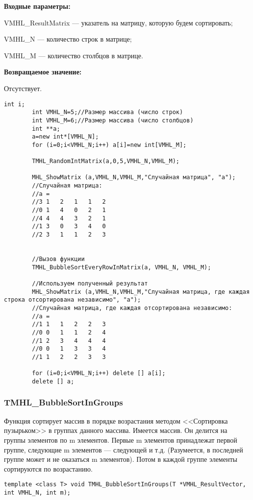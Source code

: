 \documentclass[a4paper,12pt]{article}
\begin{document}
\textbf{Входные параметры:}
 
VMHL\_ResultMatrix --- указатель на матрицу, которую будем сортировать;
 
VMHL\_N --- количество строк в матрице;
 
VMHL\_M --- количество столбцов в матрице.

\textbf{Возвращаемое значение:}

Отсутствует.


\begin{lstlisting}[label=code_use_TMHL_BubbleSortEveryRowInMatrix,caption=Пример использования]
        int i;
        int VMHL_N=5;//Размер массива (число строк)
        int VMHL_M=6;//Размер массива (число столбцов)
        int **a;
        a=new int*[VMHL_N];
        for (i=0;i<VMHL_N;i++) a[i]=new int[VMHL_M];

        TMHL_RandomIntMatrix(a,0,5,VMHL_N,VMHL_M);

        MHL_ShowMatrix (a,VMHL_N,VMHL_M,"Случайная матрица", "a");
        //Случайная матрица:
        //a =
        //3	1	2	1	1	2
        //0	1	4	0	2	1
        //4	4	4	3	2	1
        //1	3	0	3	4	0
        //2	3	1	1	2	3


        //Вызов функции
        TMHL_BubbleSortEveryRowInMatrix(a, VMHL_N, VMHL_M);

        //Используем полученный результат
		MHL_ShowMatrix (a,VMHL_N,VMHL_M,"Случайная матрица, где каждая строка отсортирована независимо", "a");
        //Случайная матрица, где каждая отсортирована независимо:
        //a =
        //1	1	1	2	2	3
        //0	0	1	1	2	4
        //1	2	3	4	4	4
        //0	0	1	3	3	4
        //1	1	2	2	3	3

        for (i=0;i<VMHL_N;i++) delete [] a[i];
        delete [] a;
\end{lstlisting}

\subsubsection{TMHL\_BubbleSortInGroups}\label{TMHL_BubbleSortInGroups}

Функция сортирует массив в порядке возрастания методом <<Сортировка пузырьком>> в группах данного массива. Имеется массив. Он делится на группы элементов по m элементов. Первые m элементов принадлежат первой группе, следующие m элементов --- следующей и т.д. (Разумеется, в последней группе может и не оказаться m элементов). Потом в каждой группе элементы сортируются по возрастанию.


\begin{lstlisting}[label=code_syntax_TMHL_BubbleSortInGroups,caption=Синтаксис]
template <class T> void TMHL_BubbleSortInGroups(T *VMHL_ResultVector, int VMHL_N, int m);
\end{lstlisting}
\end{document}
